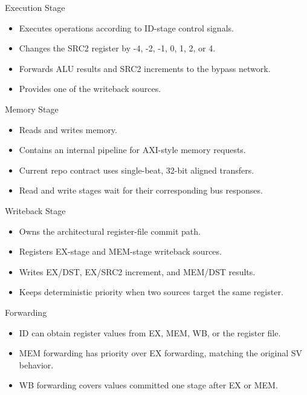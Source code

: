\documentclass[aspectratio=169,professionalfonts]{beamer}
\begin{document}
\begin{frame}{Execution Stage}
  \begin{itemize}
    \item Executes operations according to ID-stage control signals.
    \item Changes the SRC2 register by -4, -2, -1, 0, 1, 2, or 4.
    \item Forwards ALU results and SRC2 increments to the bypass network.
    \item Provides one of the writeback sources.
  \end{itemize}
\end{frame}

\begin{frame}{Memory Stage}
  \begin{itemize}
    \item Reads and writes memory.
    \item Contains an internal pipeline for AXI-style memory requests.
    \item Current repo contract uses single-beat, 32-bit aligned transfers.
    \item Read and write stages wait for their corresponding bus responses.
  \end{itemize}
\end{frame}

\begin{frame}{Writeback Stage}
  \begin{itemize}
    \item Owns the architectural register-file commit path.
    \item Registers EX-stage and MEM-stage writeback sources.
    \item Writes EX/DST, EX/SRC2 increment, and MEM/DST results.
    \item Keeps deterministic priority when two sources target the same register.
  \end{itemize}
\end{frame}

\begin{frame}{Forwarding}
  \begin{itemize}
    \item ID can obtain register values from EX, MEM, WB, or the register file.
    \item MEM forwarding has priority over EX forwarding, matching the original SV behavior.
    \item WB forwarding covers values committed one stage after EX or MEM.
  \end{itemize}
\end{frame}
\end{document}
